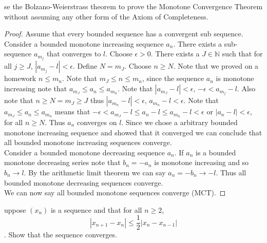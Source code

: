\documentclass[12pt]{article}
\makeatletter
\theoremstyle{homework}
\newenvironment{exercise}[1]
{\def\@currentlabel{#1}\exercisecore}
{\endexercisecore}
\makeatother
\begin{document}
\begin{exercise}

Use the Bolzano-Weierstrass theorem to prove the Monotone Convergence Theorem without assuming any other form of the Axiom of Completeness.
\end{exercise}
\begin{proof}
Assume that every bounded sequence has a convergent sub sequence.\\
Consider a bounded monotone increasing sequence $a_n$.  There exists a sub-sequence $a_{m_j}$ that converges to $l$.  Choose $\epsilon>0$.  There exists a $J\in\mathbb{N}$ such that for all $j\geq J$, $|a_{m_j}-l|<\epsilon$.  Define $N=m_J$.  Choose $n\geq N$.  Note that we proved on a homework $n\leq m_n$.  Note that $m_J\leq n\leq m_n$, since the sequence $a_n$ is monotone increasing note that $a_{m_J}\leq a_n\leq a_{m_n}$.  Note that $|a_{m_J}-l|<\epsilon$, $-\epsilon<a_{m_j}-l$.  Also note that $n\geq N=m_J\geq J$ thus $|a_{m_n}-l|<\epsilon$, $a_{m_n}-l<\epsilon$.  Note that $a_{m_J}\leq a_n\leq a_{m_n}$ means that $-\epsilon< a_{m_J}-l\leq a_n-l\leq a_{m_n}-l<\epsilon$ or $|a_n-l|<\epsilon$, for all $n\geq N$.  Thus $a_n$ converges on $l$.  Since we chose a arbitrary bounded monotone increasing sequence and showed that it converged we can conclude that all bounded monotone increasing sequences converge.\\
Consider a bounded monotone decreasing sequence $a_n$.  If $a_n$ is a bounded monotone decreasing series note that $b_n=-a_n$ is monotone increasing and so $b_n\rightarrow l$.  By the arithmetic limit theorem we can say $a_n=-b_n\rightarrow -l$.  Thus all bounded monotone decreasing sequences converge.\\
We can now say all bounded monotone sequences converge (MCT).
\end{proof}
\begin{exercise}

Suppose $(x_n)$ is a sequence and that for all $n \geq 2$,
$$|x_{n+1} - x_n| \leq\frac{1}{2}|x_n - x_{n-1}|$$.
Show that the sequence converges.
\end{exercise}
\end{document}
